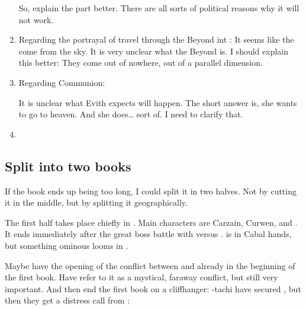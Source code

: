 \begin{enumerate}
    So, explain the  part better.
    There are all sorts of political reasons why it will not work.
  \item 
    Regarding the portrayal of travel through the Beyond int :
    It seems like the \resphain come from the sky. 
    It is very unclear what the Beyond is.
    I should explain this better: 
    They come out of nowhere, out of a parallel dimension. 
  \item 
    Regarding Communion: 
    
    It is unclear what Evith expects will happen.
    The short answer is, she wants to go to heaven.
    And she does\ldots{} sort of.
    I need to clarify that.
  \item 
\end{enumerate}










\subsection{Split into two books}
If the book ends up being too long, I could split it in two halves.
Not by cutting it in the middle, but by splitting it geographically.

The first half takes place chiefly in \Forclin.
Main characters are Carzain, Curwen, \Achsah and \Takestsha.
It ends immediately after the great boss battle with \Achsah versus \Nzessuacrith.
\Forclin is in Cabal hands, but something ominous looms in \Malcur. 

Maybe have the opening of the conflict between \Teshrial and \Ishnaruchaefir already in the beginning of the first book.
Have \Achsah refer to it as a mystical, faraway conflict, but still very important. 
And then end the first book on a cliffhanger: 
\Achsah-tachi have secured \Forclin, but then they get a distress call from \Malcur:

